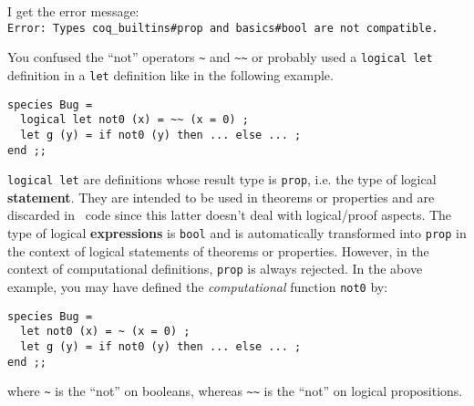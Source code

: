 \documentclass[10pt,a4paper]{article}
\begin{document}
\bigskip
\begin{faqitem}
I get the error message:\\
  \verb+Error: Types coq_builtins#prop and basics#bool are not compatible.+

\medskip
{}
You confused the ``not'' operators \lstinline"~" and \lstinline"~~" or
probably used a \lstinline"logical let" definition in a \lstinline"let"
definition like in the following example.

{\small
\begin{lstlisting}
species Bug =
  logical let not0 (x) = ~~ (x = 0) ;
  let g (y) = if not0 (y) then ... else ... ;
end ;;
\end{lstlisting}}

\lstinline"logical let" are definitions whose result type is {\tt prop}, i.e.
the type of logical {\bf statement}. They are intended to be used in theorems
or properties and are discarded in \ocaml\ code since this latter doesn't
deal with logical/proof aspects. The type of logical {\bf expressions} is
{\tt bool} and is automatically transformed into {\tt prop} in the context
of logical statements of theorems or properties. However, in the context of
computational definitions, {\tt prop} is always rejected. In the above example,
you may have defined the {\em computational} function {\tt not0} by:

{\small
\begin{lstlisting}
species Bug =
  let not0 (x) = ~ (x = 0) ;
  let g (y) = if not0 (y) then ... else ... ;
end ;;
\end{lstlisting}}

\noindent where \lstinline"~" is the ``not'' on booleans, whereas
\lstinline"~~" is the ``not'' on logical propositions.
\end{faqitem}
\end{document}
